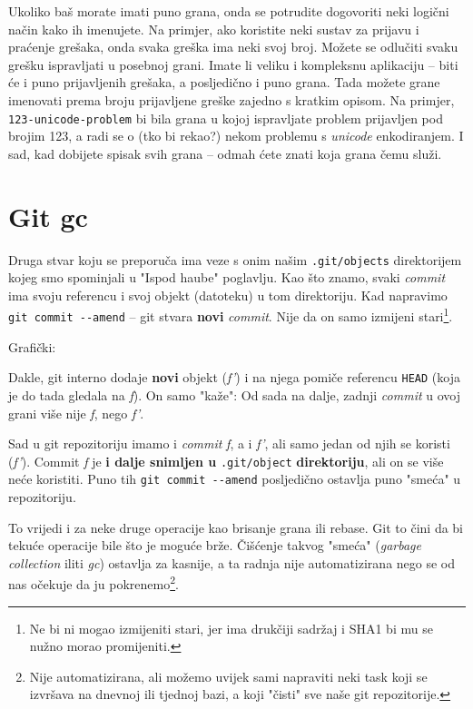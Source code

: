 Ukoliko baš morate imati puno grana, onda se potrudite dogovoriti neki logični način kako ih imenujete.
Na primjer, ako koristite neki sustav za prijavu i praćenje grešaka, onda svaka greška ima neki svoj broj.
Možete se odlučiti svaku grešku ispravljati u posebnoj grani. 
Imate li veliku i kompleksnu aplikaciju -- biti će i puno prijavljenih grešaka, a posljedično i puno grana.
Tada možete grane imenovati prema broju prijavljene greške zajedno s kratkim opisom.
Na primjer, \verb+123-unicode-problem+ bi bila grana u kojoj ispravljate problem prijavljen pod brojim 123, a radi se o (tko bi rekao?) nekom problemu s \emph{unicode} enkodiranjem.
I sad, kad dobijete spisak svih grana -- odmah ćete znati koja grana čemu služi.

\section*{Git gc}

Druga stvar koju se preporuča ima veze s onim našim \verb+.git/objects+ direktorijem kojeg smo spominjali u "Ispod haube" poglavlju.
Kao što znamo, svaki \emph{commit} ima svoju referencu i svoj objekt (datoteku) u tom direktoriju.
Kad napravimo \verb+git commit --amend+ -- git stvara \textbf{novi} \emph{commit}.
Nije da on samo izmijeni stari\footnote{Ne bi ni mogao izmijeniti stari, jer ima drukčiji sadržaj i SHA1 bi mu se nužno morao promijeniti.}.

Grafički:



Dakle, git interno dodaje \textbf{novi} objekt (\emph{f'}) i na njega pomiče referencu \verb+HEAD+ (koja je do tada gledala na \emph f).
On samo "kaže": Od sada na dalje, zadnji \emph{commit} u ovoj grani više nije \emph f, nego \emph{f'}.

Sad u git repozitoriju imamo i \emph{commit} \emph f, a i \emph{f'}, ali samo jedan od njih se koristi (\emph{f'}).
Commit \emph f je \textbf{i dalje snimljen u} \verb+.git/object+ \textbf{direktoriju}, ali on se više neće koristiti.
Puno tih \verb+git commit --amend+ posljedično ostavlja puno "smeća" u repozitoriju.

To vrijedi i za neke druge operacije kao brisanje grana ili rebase.
Git to čini da bi tekuće operacije bile što je moguće brže.
Čišćenje takvog "smeća" (\emph{garbage collection} iliti \emph{gc}) ostavlja za kasnije, a ta radnja nije automatizirana nego se od nas očekuje da ju pokrenemo\footnote{Nije automatizirana, ali možemo uvijek sami napraviti neki task koji se izvršava na dnevnoj ili tjednoj bazi, a koji "čisti" sve naše git repozitorije.}.

